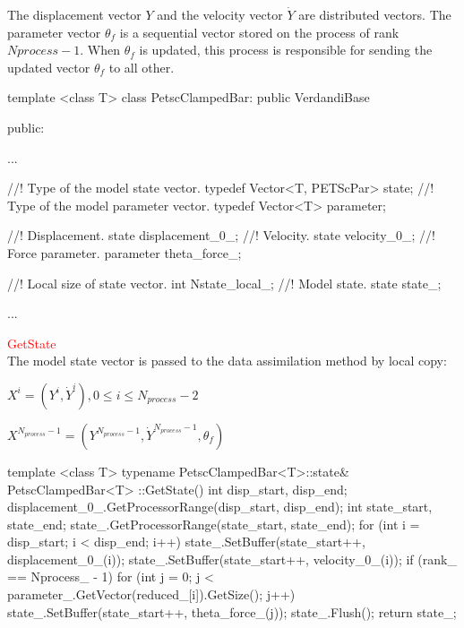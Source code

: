 The displacement vector $Y$ and the velocity vector $\dot Y$ are distributed vectors. The parameter vector $\theta_f$ is a sequential vector stored on the process of rank $Nprocess - 1$. When $\theta_f$ is updated, this process is responsible for sending the updated vector $\theta_f$ to all other.


\begin{frame_cpp}
template <class T>
class PetscClampedBar: public VerdandiBase
{
    public:

        ...

        //! Type of the model state vector.
        typedef Vector<T, PETScPar> state;
        //! Type of the model parameter vector.
        typedef Vector<T> parameter;


        //! Displacement.
        state displacement_0_;
        //! Velocity.
        state velocity_0_;
        //! Force parameter.
        parameter theta_force_;

         //! Local size of state vector.
        int Nstate_local_;
        //! Model state.
        state state_;

        ...

}
  \end{frame_cpp}



\par \textcolor{red}{GetState}\\


The model state vector is passed to the data assimilation method by local copy:


$X^i = (Y^i, \dot Y^i), 0 \le i \le N_{process} - 2 $ \par
$X^{N_{process} - 1} = (Y^{N_{process} - 1}, \dot Y^{N_{process} - 1}, \theta_f)$


 \begin{frame_cpp}
template <class T>
typename PetscClampedBar<T>::state& PetscClampedBar<T>
::GetState()
{
    int disp_start, disp_end;
    displacement_0_.GetProcessorRange(disp_start, disp_end);
    int state_start, state_end;
    state_.GetProcessorRange(state_start, state_end);
    for (int i = disp_start; i < disp_end; i++)
    {
        state_.SetBuffer(state_start++, displacement_0_(i));
        state_.SetBuffer(state_start++, velocity_0_(i));
    }
    if (rank_ == Nprocess_ - 1)
        for (int j = 0; j < parameter_.GetVector(reduced_[i]).GetSize(); j++)
            state_.SetBuffer(state_start++, theta_force_(j));
    state_.Flush();
    return state_;
}
  \end{frame_cpp}



